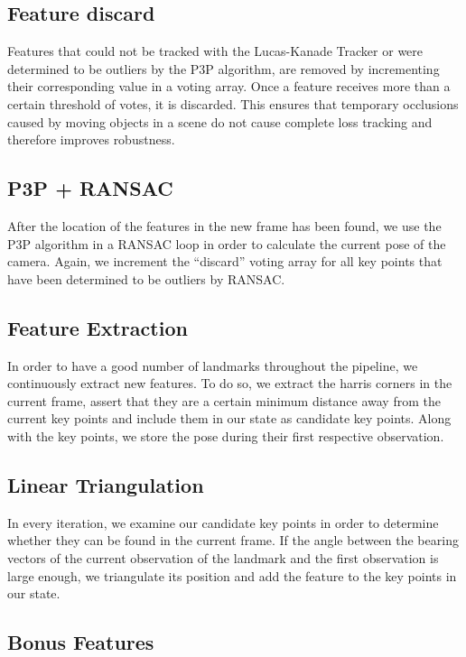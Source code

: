 \documentclass[11pt]{article}
\begin{document}
\subsection{Feature discard}
Features that could not be tracked with the Lucas-Kanade Tracker or were determined to be outliers by the P3P algorithm, are removed by incrementing their corresponding value in a voting array. Once a feature receives more than a certain threshold of votes, it is discarded. This ensures that temporary occlusions caused by moving objects in a scene do not cause complete loss tracking and therefore improves robustness.

\subsection{P3P + RANSAC}
After the location of the features in the new frame has been found, we use the P3P algorithm in a RANSAC loop in order to calculate the current pose of the camera. Again, we increment the “discard” voting array for all key points that have been determined to be outliers by RANSAC.

\subsection{Feature Extraction}
In order to have a good number of landmarks throughout the pipeline, we continuously extract new features. To do so, we extract the harris corners in the current frame, assert that they are a certain minimum distance away from the current key points and include them in our state as candidate key points. Along with the key points, we store the pose during their first respective observation.

\subsection{Linear Triangulation} 
In every iteration, we examine our candidate key points in order to determine whether they can be found in the current frame. If the angle between the bearing vectors of the current observation of the landmark and the first observation is large enough, we triangulate its position and add the feature to the key points in our state.

\subsection{Bonus Features}
\end{document}
